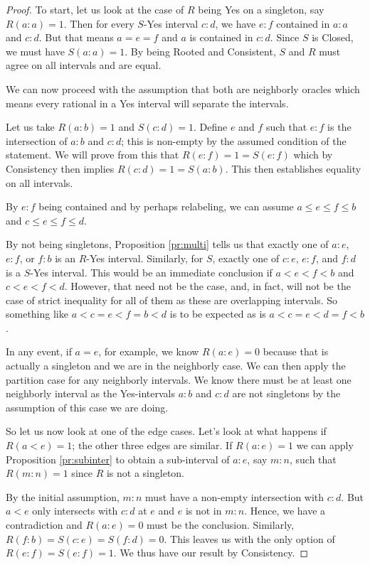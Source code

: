 \documentclass[12pt]{article}
\theoremstyle{remark}
\begin{document}
\begin{proof}
To start, let us look at the case of $R$ being Yes on a singleton, say $R(a:a) = 1$. Then for every $S$-Yes interval $c:d$, we have $e:f$ contained in $a:a$ and $c:d$. But that means $a=e=f$ and $a$ is contained in $c:d$. Since $S$ is Closed, we must have $S(a:a)=1$. By being Rooted and Consistent, $S$ and $R$ must agree on all intervals and are equal. 

We can now proceed with the assumption that both are neighborly oracles which means every rational in a Yes interval will separate the intervals. 

Let us take $R(a:b) = 1$ and $S(c:d) = 1$. Define $e$ and $f$ such that $e:f$ is the intersection of $a:b$ and $c:d$; this is non-empty by the assumed condition of the statement. We will prove from this that $R(e:f)=1 = S(e:f)$ which by Consistency then implies $R(c:d) = 1 = S(a:b)$. This then establishes equality on all intervals. 

By $e:f$ being contained and by perhaps relabeling, we can assume $a \leq e \leq f \leq b$ and $c \leq e \leq f \leq d$. 

By not being singletons, Proposition \ref{pr:multi} tells us that exactly one of $a:e$, $e:f$, or $f:b$ is an $R$-Yes interval. Similarly, for $S$, exactly one of $c:e$, $e:f$, and $f:d$ is a $S$-Yes interval. This would be an immediate conclusion if $a < e < f < b$ and $c < e < f < d$. However, that need not be the case, and, in fact, will not be the case of strict inequality for all of them as these are overlapping intervals. So something like $a < c = e < f = b < d$ is to be expected as is $a < c = e < d = f < b$. 

In any event, if $a=e$, for example, we know $R(a:e) = 0$ because that is actually a singleton and we are in the neighborly case. We can then apply the partition case for any neighborly intervals. We know there must be at least one neighborly interval as the Yes-intervals $a:b$ and $c:d$ are not singletons by the assumption of this case we are doing. 

So let us now look at one of the edge cases. Let's look at what happens if $R(a\lt e) = 1$; the other three edges are similar. If $R(a:e) =1$ we can apply Proposition \ref{pr:subinter} to obtain a sub-interval of $a:e$, say $m:n$, such that $R(m:n) = 1$ since $R$ is not a singleton. 

By the initial assumption, $m:n$ must have a non-empty intersection with $c:d$. But $a\lt e$ only intersects with $c:d$ at $e$ and $e$ is not in $m:n$. Hence, we have a contradiction and $R(a:e)=0$ must be the conclusion. Similarly, $R(f:b) = S(c:e) = S(f:d) = 0$. This leaves us with the only option of $R(e:f) = S(e:f) = 1$. We thus have our result by Consistency.  

\end{proof}
\end{document}
